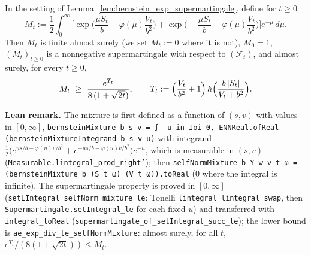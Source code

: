 \begin{lemma}\label{lem:pconc_bernstein_mixture}
\leanok
In the setting of Lemma~\ref{lem:bernstein_exp_supermartingale}, define for $t \ge 0$
\[
  M_t := \frac12 \int_0^\infty \Big[ \exp\Big(\frac{\mu S_t}{b} - \varphi(\mu)\frac{V_t}{b^2}\Big) + \exp\Big(-\frac{\mu S_t}{b} - \varphi(\mu)\frac{V_t}{b^2}\Big) \Big] e^{-\mu}\, d\mu .
\]
Then $M_t$ is finite almost surely (we set $M_t := 0$ where it is not), $M_0 = 1$, $(M_t)_{t \ge 0}$ is
a nonnegative supermartingale with respect to $(\mathcal F_t)$, and almost surely, for every $t \ge 0$,
\[
  M_t \ \ge\ \frac{e^{T_t}}{8\,(1 + \sqrt{2t})}, \qquad
  T_t := \Big(\frac{V_t}{b^2} + 1\Big)\, h\Big(\frac{b\, \lvert S_t \rvert}{V_t + b^2}\Big) .
\]
\end{lemma}

\textbf{Lean remark.} The mixture is first defined as a function of $(s, v)$ with values in
$[0, \infty]$, \texttt{bernsteinMixture b s v = ∫⁻ u in Ioi 0, ENNReal.ofReal
(bernsteinMixtureIntegrand b s v u)} with integrand
$\frac12\big(e^{us/b - \varphi(u)v/b^2} + e^{-us/b - \varphi(u)v/b^2}\big)e^{-u}$, which is measurable
in $(s, v)$ (\texttt{Measurable.lintegral\_prod\_right'}); then
\texttt{selfNormMixture b Y w v t ω = (bernsteinMixture b (S t ω) (V t ω)).toReal} ($0$ where the
integral is infinite). The supermartingale property is proved in $[0, \infty]$
(\texttt{setLIntegral\_selfNorm\_mixture\_le}: Tonelli \texttt{lintegral\_lintegral\_swap}, then
\texttt{Supermartingale.setIntegral\_le} for each fixed $u$) and transferred with
\texttt{integral\_toReal} (\texttt{supermartingale\_of\_setIntegral\_succ\_le}); the lower bound is
\texttt{ae\_exp\_div\_le\_selfNormMixture}: almost surely, for all $t$,
$e^{T_t}/(8(1 + \sqrt{2t})) \le M_t$.

